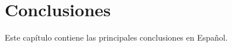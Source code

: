 \chapter{Conclusiones\label{Conclusiones}}

Este capítulo contiene las principales conclusiones en Español.
